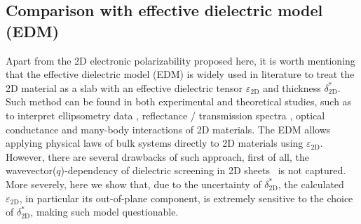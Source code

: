 \subsection{Comparison with effective dielectric model (EDM)}
\label{sec:diel-comp-with-effect}

Apart from the 2D electronic polarizability proposed here, it is worth
mentioning that the effective dielectric model (EDM) is widely used in
literature to treat the 2D material as a slab with an effective
dielectric tensor $\varepsilon_{\mathrm{2D}}$ and thickness
$\delta^{*}_{\mathrm{2D}}$. Such method can be found in both
experimental and theoretical studies, such as to interpret
ellipsometry data
\cite{graphene-epsilon10,Duesberg_2014_opt_MoS2,Chiang13,}, reflectance / transmission spectra \cite{Li_2014_opt_ml_mos2,
  Yoffe-Wilson69}, optical conductance \cite{Matthes_2016_effective_PRB} and
many-body interactions \cite{Sohier_2016_2D_eps,Markel_2016_EMT} of 2D
materials. The EDM allows applying physical laws of bulk systems
directly to 2D materials using $\varepsilon_{\mathrm{2D}}$. However,
there are several drawbacks of such approach, first of all, the
wavevector($q$)-dependency of dielectric screening in 2D
sheets~\cite{Cudazzo_2011_screening_2D,Olsen_2016_hydrogen,Trolle_2017_eps_subst}
is not captured. More severely, here we show that, due to the
uncertainty of $\delta^{*}_{\mathrm{2D}}$, the calculated
$\varepsilon_{\mathrm{2D}}$, in particular its out-of-plane component,
is extremely sensitive to the choice of $\delta^{*}_{\mathrm{2D}}$,
making such model questionable.

